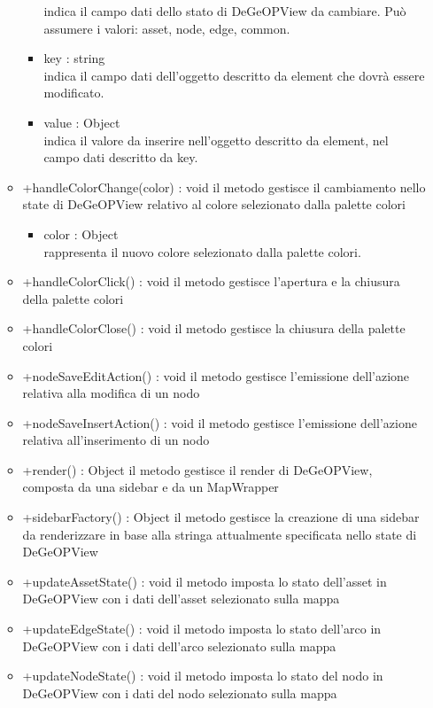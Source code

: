 \begin{itemize}
\begin{itemize}
\begin{itemize}
			indica il campo dati dello stato di DeGeOPView da cambiare. Può assumere i valori:
			asset, node, edge, common.
			\item key : string\\
			indica il campo dati dell'oggetto descritto da element che dovrà essere modificato.
			\item value : Object\\
			indica il valore da inserire nell'oggetto descritto da element, nel campo dati descritto da key.
		\end{itemize}
		\item +handleColorChange(color) : void\newline
		il metodo gestisce il cambiamento nello state di DeGeOPView relativo al colore selezionato dalla palette colori
		\begin{itemize}
			\item color : Object\\
			rappresenta il nuovo colore selezionato dalla palette colori.
		\end{itemize}
		\item +handleColorClick() : void\newline
		il metodo gestisce l'apertura e la chiusura della palette colori
		\item +handleColorClose() : void\newline
		il metodo gestisce la chiusura della palette colori
		\item +nodeSaveEditAction() : void\newline
		il metodo gestisce l'emissione dell'azione relativa alla modifica di un nodo
		\item +nodeSaveInsertAction() : void\newline
		il metodo gestisce l'emissione dell'azione relativa all'inserimento di un nodo
		\item +render() : Object\newline
		il metodo gestisce il render di DeGeOPView, composta da una sidebar e da un MapWrapper
		\item +sidebarFactory() : Object\newline
		il metodo gestisce la creazione di una sidebar da renderizzare in base alla stringa attualmente specificata nello state di DeGeOPView
		\item +updateAssetState() : void\newline
		il metodo imposta lo stato dell'asset in DeGeOPView con i dati dell'asset selezionato sulla mappa
		\item +updateEdgeState() : void\newline
		il metodo imposta lo stato dell'arco in DeGeOPView con i dati dell'arco selezionato sulla mappa
		\item +updateNodeState() : void\newline
		il metodo imposta lo stato del nodo in DeGeOPView con i dati del nodo selezionato sulla mappa
	\end{itemize}
\end{itemize}
\newpage
